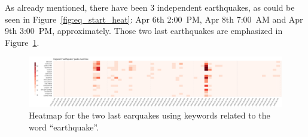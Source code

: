As already mentioned, there have been 3 independent earthquakes, as could be 
seen in Figure~\ref{fig:eq_start_heat}: Apr 6th 2:00~PM, Apr 8th 7:00~AM and Apr 
9th 3:00~PM, approximately. Those two last earthquakes are emphasized in
Figure~\ref{fig:eq_2_3_heat}.

\begin{figure}[!h]
    \centering
    \includegraphics[width=1.00\textwidth]{figs/q2/eq_2_3_heat}
    \caption{Heatmap for the two last earquakes using keywords related to the
    word ``earthquake''.}
    \label{fig:eq_2_3_heat}
\end{figure}

